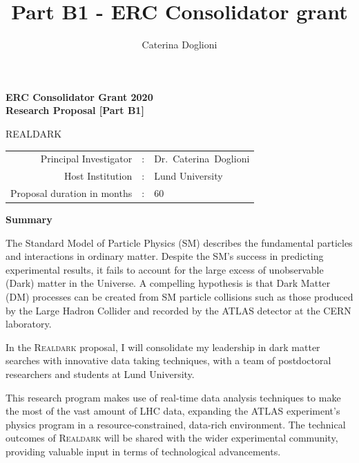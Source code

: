 \documentclass[11pt,a4paper]{article}
\title{{\Large Part B1 - ERC Consolidator grant}}
\author{{\normalsize Caterina Doglioni}}
\date{}                                           %
\begin{document}
\begin{center} 

{\Large\bf ERC Consolidator Grant 2020} \\
	{\Large\bf Research Proposal [Part B1]}  \\
 
\vspace{2cm} 
{\huge {\bf }}   \smallskip  

\vspace{2cm} 
{\Huge{REALDARK}} \\ 
\vspace{1cm} 
\vspace{1cm}
\end{center} 
\begin{tabular}{rcl}
Principal Investigator & : & Dr.~Caterina~Doglioni \\
Host Institution & : & Lund University \\ 
Proposal duration in months & : & 60 \\
\end{tabular}  
\vspace{2cm}


\begin{center} {\bf Summary}  \end{center}

The Standard Model of Particle Physics (SM) describes the fundamental particles and interactions in ordinary matter. Despite the SM's success in predicting experimental results, it fails to account for the large excess of unobservable (Dark) matter in the Universe. A compelling hypothesis is that Dark Matter (DM) processes can be created from SM particle collisions such as those produced by the Large Hadron Collider and recorded by the ATLAS detector at the CERN laboratory. 

In the \textsc{Realdark} proposal, I will consolidate my leadership in dark matter searches with innovative data taking techniques, with a team of postdoctoral researchers and students at Lund University. 

This research program makes use of real-time data analysis techniques to make the most of the vast amount of LHC data, expanding the ATLAS experiment’s physics program in a resource-constrained, data-rich environment. The technical outcomes of \textsc{Realdark} will be shared with the wider experimental community, providing valuable input in terms of  technological advancements. 
\end{document}
